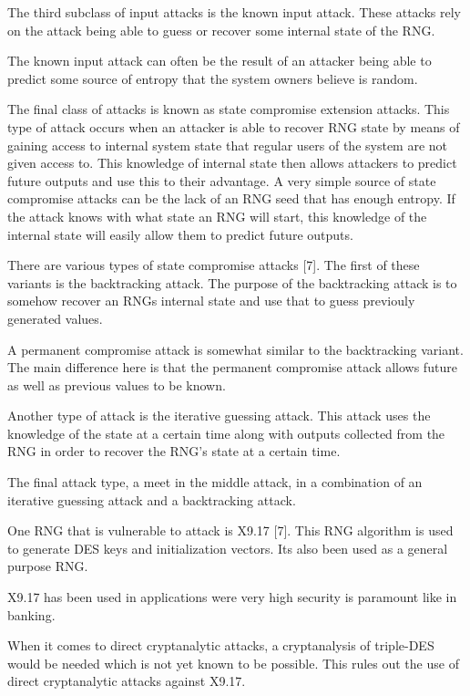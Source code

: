 \documentclass{article}
\begin{document}
    The third subclass of input attacks is the known input attack. These attacks
    rely on the attack being able to guess or recover some internal state of the RNG.

    The known input attack can often be the result of an attacker being able to
    predict some source of entropy that the system owners believe is random.

    The final class of attacks is known as state compromise extension attacks.
    This type of attack occurs when an attacker is able to recover RNG state
    by means of gaining access to internal system state that regular users of the system
    are not given access to. This knowledge of internal state then allows attackers
    to predict future outputs and use this to their advantage.
    A very simple source of state compromise attacks can be the lack of an RNG
    seed that has enough entropy. If the attack knows with what state an RNG
    will start, this knowledge of the internal state will easily allow them
    to predict future outputs.

    There are various types of state compromise attacks [7].
    The first of these variants is the backtracking attack. The purpose
    of the backtracking attack is to somehow recover an RNGs internal state
    and use that to guess previouly generated values.

    A permanent compromise attack is somewhat similar to the backtracking variant.
    The main difference here is that the permanent compromise attack
    allows future as well as previous values to be known.

    Another type of attack is the iterative guessing attack. This attack uses
    the knowledge of the state at a certain time along with outputs collected
    from the RNG in order to recover the RNG's state at a certain time.

    The final attack type, a meet in the middle attack, in a combination
    of an iterative guessing attack and a backtracking attack.


    One RNG that is vulnerable to attack is X9.17 [7]. This RNG algorithm
    is used to generate DES keys and initialization vectors.
    Its also been used as a general purpose RNG.

    X9.17 has been used in applications were very high security is paramount like in
    banking.

    When it comes to direct cryptanalytic attacks, a cryptanalysis of triple-DES
    would be needed which is not yet known to be possible.
    This rules out the use of direct cryptanalytic attacks against X9.17.
\end{document}
